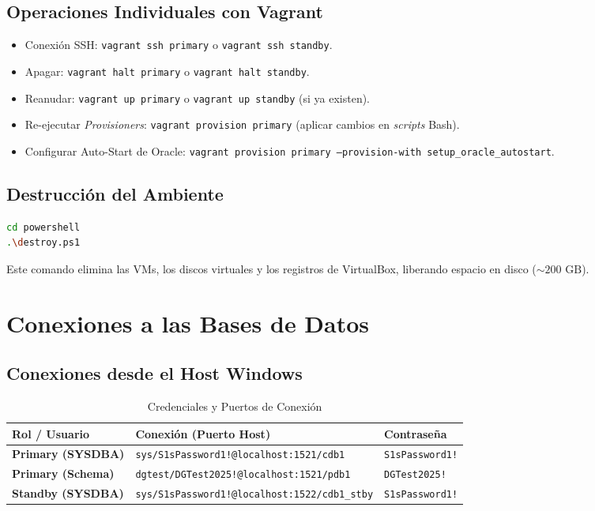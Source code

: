 \documentclass[11pt, a4paper]{report}
\begin{document}
\subsection{Operaciones Individuales con Vagrant}

\begin{itemize}
    \item Conexión SSH: \texttt{vagrant ssh primary} o \texttt{vagrant ssh standby}.
\item Apagar: \texttt{vagrant halt primary} o \texttt{vagrant halt standby}.
    \item Reanudar: \texttt{vagrant up primary} o \texttt{vagrant up standby} (si ya existen).
\item Re-ejecutar \textit{Provisioners}: \texttt{vagrant provision primary} (aplicar cambios en \textit{scripts} Bash).
\item Configurar Auto-Start de Oracle: \texttt{vagrant provision primary --provision-with setup\_oracle\_autostart}.
\end{itemize}

\subsection{Destrucción del Ambiente}

\begin{lstlisting}[language=bash, caption={Destrucción Completa (Recomendado)}]
cd powershell
.\destroy.ps1
\end{lstlisting}
Este comando elimina las VMs, los discos virtuales y los registros de VirtualBox, liberando espacio en disco ($\sim 200\text{ GB}$).
\section{Conexiones a las Bases de Datos}

\subsection{Conexiones desde el Host Windows}

\begin{table}[htbp]
    \centering
    \caption{Credenciales y Puertos de Conexión}
    \label{tab:conexiones_host}
    \begin{tabular}{lll}
        \toprule
        \textbf{Rol / Usuario} & \textbf{Conexión (Puerto Host)} & \textbf{Contraseña} \\
        \midrule
        \textbf{Primary (SYSDBA)} & \texttt{sys/S1sPassword1!@localhost:1521/cdb1} & \texttt{S1sPassword1!} \\
        \textbf{Primary (Schema)} & \texttt{dgtest/DGTest2025!@localhost:1521/pdb1} & \texttt{DGTest2025!} \\
        \textbf{Standby (SYSDBA)}
& \texttt{sys/S1sPassword1!@localhost:1522/cdb1\_stby} & \texttt{S1sPassword1!} \\
        \bottomrule
    \end{tabular}
\end{table}
\end{document}
